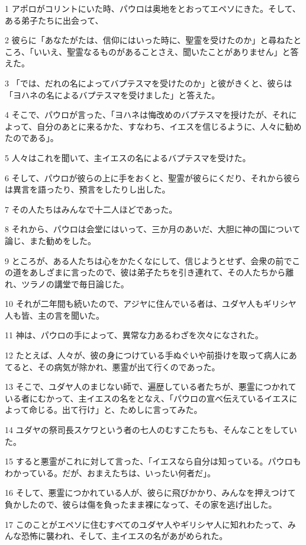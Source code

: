 \par 1 アポロがコリントにいた時、パウロは奥地をとおってエペソにきた。そして、ある弟子たちに出会って、
\par 2 彼らに「あなたがたは、信仰にはいった時に、聖霊を受けたのか」と尋ねたところ、「いいえ、聖霊なるものがあることさえ、聞いたことがありません」と答えた。
\par 3 「では、だれの名によってバプテスマを受けたのか」と彼がきくと、彼らは「ヨハネの名によるバプテスマを受けました」と答えた。
\par 4 そこで、パウロが言った、「ヨハネは悔改めのバプテスマを授けたが、それによって、自分のあとに来るかた、すなわち、イエスを信じるように、人々に勧めたのである」。
\par 5 人々はこれを聞いて、主イエスの名によるバプテスマを受けた。
\par 6 そして、パウロが彼らの上に手をおくと、聖霊が彼らにくだり、それから彼らは異言を語ったり、預言をしたりし出した。
\par 7 その人たちはみんなで十二人ほどであった。
\par 8 それから、パウロは会堂にはいって、三か月のあいだ、大胆に神の国について論じ、また勧めをした。
\par 9 ところが、ある人たちは心をかたくなにして、信じようとせず、会衆の前でこの道をあしざまに言ったので、彼は弟子たちを引き連れて、その人たちから離れ、ツラノの講堂で毎日論じた。
\par 10 それが二年間も続いたので、アジヤに住んでいる者は、ユダヤ人もギリシヤ人も皆、主の言を聞いた。
\par 11 神は、パウロの手によって、異常な力あるわざを次々になされた。
\par 12 たとえば、人々が、彼の身につけている手ぬぐいや前掛けを取って病人にあてると、その病気が除かれ、悪霊が出て行くのであった。
\par 13 そこで、ユダヤ人のまじない師で、遍歴している者たちが、悪霊につかれている者にむかって、主イエスの名をとなえ、「パウロの宣べ伝えているイエスによって命じる。出て行け」と、ためしに言ってみた。
\par 14 ユダヤの祭司長スケワという者の七人のむすこたちも、そんなことをしていた。
\par 15 すると悪霊がこれに対して言った、「イエスなら自分は知っている。パウロもわかっている。だが、おまえたちは、いったい何者だ」。
\par 16 そして、悪霊につかれている人が、彼らに飛びかかり、みんなを押えつけて負かしたので、彼らは傷を負ったまま裸になって、その家を逃げ出した。
\par 17 このことがエペソに住むすべてのユダヤ人やギリシヤ人に知れわたって、みんな恐怖に襲われ、そして、主イエスの名があがめられた。
